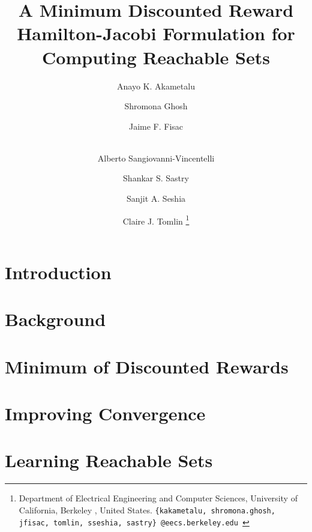 \documentclass[letterpaper, 10 pt, journal]{ieeeconf}
\title{\LARGE \bf
A Minimum Discounted Reward Hamilton-Jacobi Formulation for Computing Reachable Sets 
}
\author{
Anayo K. Akametalu \and Shromona Ghosh \and Jaime F. Fisac \and \\ Alberto Sangiovanni-Vincentelli \and Shankar S. Sastry \and Sanjit A. Seshia \and  Claire J. Tomlin
\thanks{
 Department of Electrical Engineering and Computer Sciences, 
        University of California, Berkeley , United States.\newline
        {\tt\small \{kakametalu, shromona.ghosh, jfisac, tomlin, sseshia, sastry\}~@eecs.berkeley.edu }}%
}
\begin{document}
\maketitle
\thispagestyle{empty}
\pagestyle{empty}



\section{Introduction \label{sec:intro}}


\section{Background \label{sec:back}} 


\section {Minimum of Discounted Rewards \label{sec:mdr}}


\section{Improving Convergence \label{sec:conv}}


\section{Learning Reachable Sets \label{sec:learn}}

\end{document}
